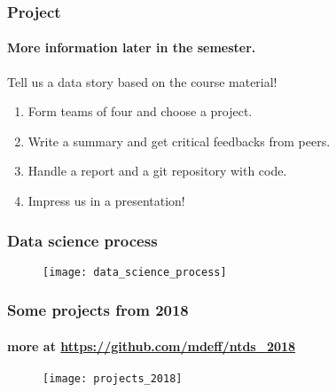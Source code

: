\documentclass[aspectratio=169]{beamer}
\begin{document}
\begin{frame}
	\frametitle{Project}
	\framesubtitle{More information later in the semester.}
	\begin{center}
		Tell us a data story based on the course material!
	\end{center}
	\vfill
	\begin{enumerate}
		\item Form teams of four and choose a project.
		\vfill
		\item Write a summary and get critical feedbacks from peers. %
		\vfill
		\item Handle a report and a git repository with code.
		\vfill
		\item Impress us in a presentation!
	\end{enumerate}
\end{frame}


\begin{frame}
	\frametitle{Data science process}
	\begin{figure}
		\texttt{[image: data\_science\_process]}
	\end{figure}
\end{frame}


\begin{frame}
	\frametitle{Some projects from 2018}
	\framesubtitle{more at \url{https://github.com/mdeff/ntds_2018}}
	\begin{figure}
		\texttt{[image: projects\_2018]}
	\end{figure}
\end{frame}

\end{document}
